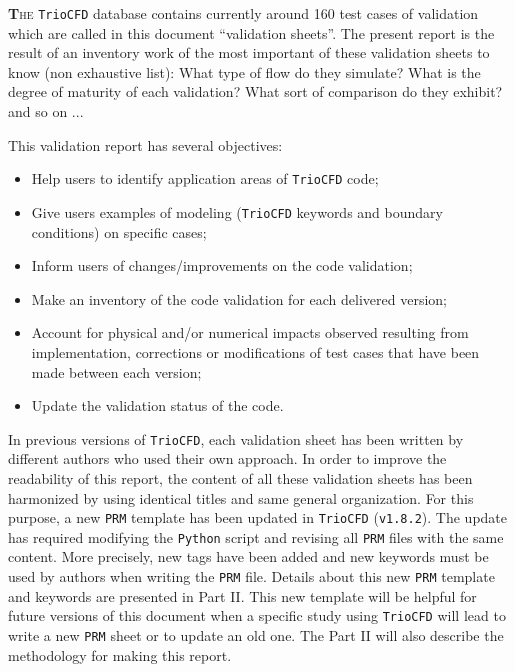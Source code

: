 \lettrine[lines=2,slope=0pt,nindent=4pt]{\textbf{T}}{he} \texttt{TrioCFD}
database contains currently around 160 test cases of validation which
are called in this document ``validation sheets''. The present
report is the result of an inventory work of the most important of these validation
sheets to know (non exhaustive list): What type of flow do they simulate?
What is the degree of maturity of each validation? What sort of
comparison do they exhibit? and so on ... \smallskip\newline

This validation report has several objectives:
\begin{itemize}
\item Help users to identify application areas of \texttt{TrioCFD} code;
\item Give users examples of modeling (\texttt{TrioCFD} keywords and boundary
conditions) on specific cases;
\item Inform users of changes/improvements on the code validation;
\item Make an inventory of the code validation for each delivered version;
\item Account for physical and/or numerical impacts observed resulting from
implementation, corrections or modifications of test cases that have
been made between each version;
\item Update the validation status of the code.
\end{itemize}

In previous versions of \texttt{TrioCFD}, each validation sheet has
been written by different authors who used their own approach. In order
to improve the readability of this report, the content of all these validation
sheets has been harmonized by using identical titles and same general
organization. For this purpose, a new \texttt{PRM} template has been
updated in \texttt{TrioCFD} (\texttt{v1.8.2}). The update has required
modifying the \texttt{Python} script and revising all \texttt{PRM}
files with the same content. More precisely, new tags have been added
and new keywords must be used by authors when writing the \texttt{PRM}
file. Details about this new \texttt{PRM} template and keywords are presented
in Part II. This new template will be helpful for future versions
of this document when a specific study using \texttt{TrioCFD} will
lead to write a new \texttt{PRM} sheet or to update an old one. The Part II
will also describe the methodology for making this report.\smallskip\newline

